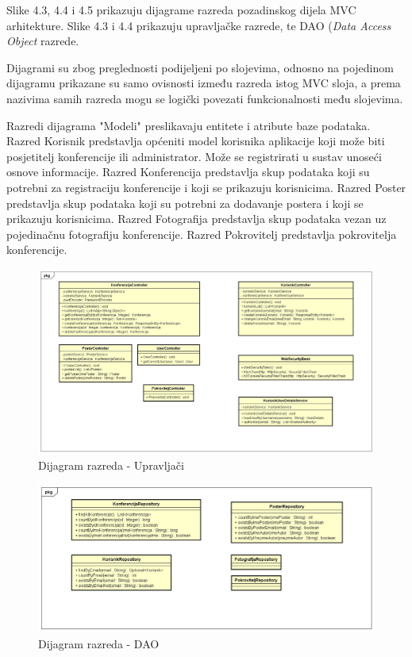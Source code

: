 			Slike 4.3, 4.4 i 4.5 prikazuju dijagrame razreda pozadinskog dijela MVC arhitekture. Slike 4.3 i 4.4 prikazuju upravljačke razrede, te DAO (\textit{Data Access Object} razrede. 
			
			Dijagrami su zbog preglednosti podijeljeni po slojevima, odnosno na pojedinom dijagramu prikazane su samo ovisnosti između razreda istog MVC sloja, a prema nazivima samih razreda mogu se logički povezati funkcionalnosti među slojevima.
			
			Razredi dijagrama "Modeli" preslikavaju entitete i atribute baze podataka. Razred Korisnik predstavlja općeniti model korisnika aplikacije koji može biti posjetitelj konferencije ili administrator. Može se registrirati u sustav unoseći osnove informacije. Razred Konferencija predstavlja skup podataka koji su potrebni za registraciju konferencije i koji se prikazuju korisnicima. Razred Poster predstavlja skup podataka koji su potrebni za dodavanje postera i koji se prikazuju korisnicima. Razred Fotografija predstavlja skup podataka vezan uz pojedinačnu fotografiju konferencije. Razred Pokrovitelj predstavlja pokrovitelja konferencije.
			
			\begin{figure} [hbt!]
				\includegraphics[width=\linewidth]{Slike/ClassDiagramControllerPremaKodu}
				\caption{Dijagram razreda - Upravljači}
			\end{figure}
			
			\begin{figure} [hbt!]
				\includegraphics[width=\linewidth]{Slike/ClassDiagramRepositoryPremaKodu}
				\caption{Dijagram razreda - DAO}
			\end{figure}
			
